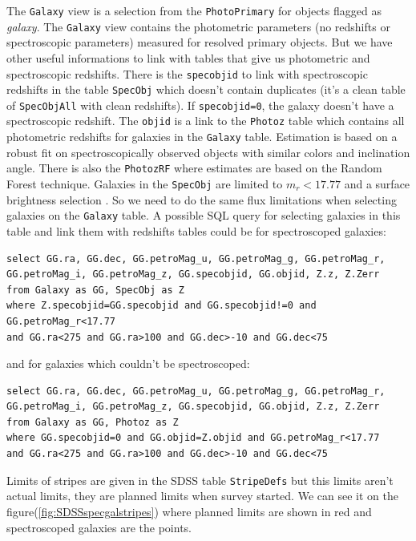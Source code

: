 The \texttt{Galaxy} view is a selection from the \texttt{PhotoPrimary} for objects flagged as \emph{galaxy}. The \texttt{Galaxy}
view contains the photometric parameters (no redshifts or spectroscopic parameters) measured for resolved primary objects. But we
have other useful informations to link with tables that give us photometric and spectroscopic redshifts. There is the
\texttt{specobjid} to link with spectroscopic redshifts in the table \texttt{SpecObj} which doesn't contain duplicates (it's a clean
table of \texttt{SpecObjAll} with clean redshifts). If \texttt{specobjid=0}, the galaxy doesn't have a spectroscopic redshift. The
\texttt{objid} is a link to the \texttt{Photoz} table which contains all photometric redshifts for galaxies in the \texttt{Galaxy}
table. Estimation is based on a robust fit on spectroscopically observed objects with similar colors and inclination angle. There is
also the \texttt{PhotozRF} where estimates are based on the Random Forest technique. Galaxies in the \texttt{SpecObj} are limited to
$m_r<17.77$ and a surface brightness selection . So we need to do the same flux limitations when selecting galaxies
on the \texttt{Galaxy} table. A possible SQL query for selecting galaxies in this table and link them with redshifts tables could
be for spectroscoped galaxies:
\begin{listing}[H]
\begin{verbatim}
select GG.ra, GG.dec, GG.petroMag_u, GG.petroMag_g, GG.petroMag_r,
GG.petroMag_i, GG.petroMag_z, GG.specobjid, GG.objid, Z.z, Z.Zerr
from Galaxy as GG, SpecObj as Z
where Z.specobjid=GG.specobjid and GG.specobjid!=0 and GG.petroMag_r<17.77
and GG.ra<275 and GG.ra>100 and GG.dec>-10 and GG.dec<75
\end{verbatim}
\end{listing}
\noindent and for galaxies which couldn't be spectroscoped:
\begin{listing}[H]
\begin{verbatim}
select GG.ra, GG.dec, GG.petroMag_u, GG.petroMag_g, GG.petroMag_r,
GG.petroMag_i, GG.petroMag_z, GG.specobjid, GG.objid, Z.z, Z.Zerr
from Galaxy as GG, Photoz as Z
where GG.specobjid=0 and GG.objid=Z.objid and GG.petroMag_r<17.77
and GG.ra<275 and GG.ra>100 and GG.dec>-10 and GG.dec<75
\end{verbatim}
\end{listing}

Limits of stripes are given in the SDSS table \texttt{StripeDefs} but this limits aren't actual limits, they are planned limits when
survey started. We can see it on the figure(\ref{fig:SDSSspecgalstripes}) where planned limits are shown in red and spectroscoped
galaxies are the points.

